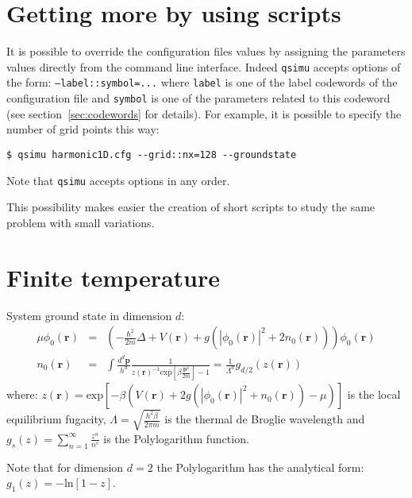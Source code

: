 \documentclass[12pt,a4paper]{report}
\newcommand{\abs}[1]{\left|#1\right|}
\newcommand{\qsimu}{\texttt{qsimu}{} }
\renewcommand{\exp}[1]{\textrm{exp}\left[#1\right]}
\renewcommand{\ln}[1]{\textrm{ln}\left[#1\right]}
\begin{document}
\appendix
\chapter{Getting more by using scripts}
It is possible to override the configuration files values by assigning the parameters values directly from the command line interface.
Indeed \qsimu accepts options of the form: \texttt{--label::symbol=...} where \texttt{label} is one of the label codewords of the configuration file and \texttt{symbol} is one of the parameters related to this codeword (see section~\ref{sec:codewords} for details).
For example, it is possible to specify the number of grid points this way:
\begin{verbatim}
$ qsimu harmonic1D.cfg --grid::nx=128 --groundstate
\end{verbatim}
Note that \qsimu accepts options in any order.

This possibility makes easier the creation of short scripts to study the same problem with small variations.

\chapter{Finite temperature}
System ground state in dimension $d$:
\begin{subequations}
\begin{eqnarray}
\mu \phi_0(\bm{r})&=&\left(-\frac{\hbar^2}{2m}\Delta+V(\bm{r})+g\left(\abs{\phi_0(\bm{r})}^2+2n_0(\bm{r})\right)\right)\phi_0(\bm{r})\\
n_0(\bm{r})&=&\int\frac{d^d\bm{p}}{h^d}
\frac{1}{z(\bm{r})^{-1}\exp{\beta\frac{\bm{p}^2}{2m}}-1}
=\frac{1}{\Lambda^d}g_{d/2}\left(z(\bm{r})\right)
\end{eqnarray}
\end{subequations}
where: $z(\bm{r})=\exp{-\beta\left(V(\bm{r})+2g\left(\abs{\phi_0(\bm{r})}^2+n_0(\bm{r})\right)-\mu\right)}$ is the local equilibrium fugacity, $\Lambda=\sqrt{\frac{h^2\beta}{2\pi m}}$ is the thermal de Broglie wavelength and $g_s(z)=\sum_{n=1}^\infty\frac{z^n}{n^s}$ is the Polylogarithm function.

Note that for dimension $d=2$ the Polylogarithm has the analytical form: $g_1(z)=-\ln{1-z}$.
\end{document}
